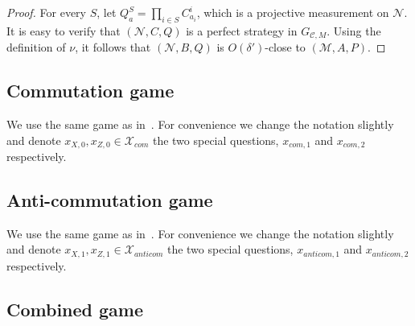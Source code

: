 \documentclass[11pt]{article}
\theoremstyle{definition}
\newcommand{\code}{\mathcal{C}}
\DeclareMathOperator*{\Expectation}{\mathbb{E}}
\newcommand{\Es}[1]{\Expectation_{#1}}
\newcommand{\field}{\mathbb{F}_2}
\newcommand{\mM}{\ensuremath{\mathcal{M}}}
\newcommand{\mX}{\ensuremath{\mathcal{X}}}
\newcommand{\mN}{\mathcal{N}}
\begin{document}
\begin{proof}
For every $S$, let $Q^S_a = \prod_{i\in S} C^i_{a_i}$, which is a projective measurement on $\mN$. It is easy to verify that $(\mN,C,Q)$ is a perfect strategy in $G_{\code,M}$. Using the definition of $\nu$, it follows that   $(\mN,B,Q)$ is $O({\delta'})$-close to $(\mM,A,P)$.

\end{proof}


\subsection{Commutation game}

We use the same game as in~\cite[Section 3.1]{de2022spectral}. For convenience we change the notation slightly and denote $x_{X,0}, x_{Z,0} \in \mX_{com}$ the two special questions, $x_{com,1}$ and $x_{com,2}$ respectively. 

\subsection{Anti-commutation game}

We use the same game as in~\cite[Section 3.2]{de2022spectral}. For convenience we change the notation slightly and  denote $x_{X,1}, x_{Z,1} \in \mX_{anticom}$ the two special questions, $x_{anticom,1}$ and $x_{anticom,2}$ respectively. 

\subsection{Combined game}
\end{document}
